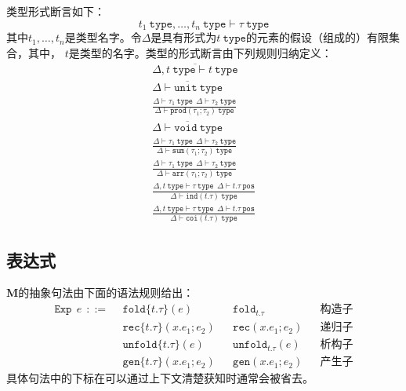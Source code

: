 类型形式断言如下：$$t_1\ \texttt{type},\dots,t_n\ \texttt{type}\vdash\tau\ \texttt{type}$$
其中$t_1,\dots,t_n$是类型名字。令$\Delta$是具有形式为$t\ \texttt{type}$的元素的假设（组成的）有限集合，其中，
$t$是类型的名字。类型的形式断言由下列规则归纳定义：
\begin{subequations}
	\begin{gather}
	\overline{\Delta,t\ \texttt{type}\vdash t\ \texttt{type}} \\
	\overline{\Delta\vdash\texttt{unit}\ \texttt{type}} \\
	\frac{\Delta\vdash\tau_1\ \texttt{type}\ \ \Delta\vdash\tau_2\ \texttt{type}}
	{\Delta\vdash\texttt{prod}(\tau_1;\tau_2)\ \texttt{type}} \\
	\overline{\Delta\vdash\texttt{void}\ \texttt{type}} \\
	\frac{\Delta\vdash\tau_1\ \texttt{type}\ \ \Delta\vdash\tau_2\ \texttt{type}}
	{\Delta\vdash\texttt{sum}(\tau_1;\tau_2)\ \texttt{type}} \\
	\frac{\Delta\vdash\tau_1\ \texttt{type}\ \ \Delta\vdash\tau_2\ \texttt{type}}
	{\Delta\vdash\texttt{arr}(\tau_1;\tau_2)\ \texttt{type}} \\
	\frac{\Delta,t\ \texttt{type}\vdash\tau\ \texttt{type}\ \ \Delta\vdash t.\tau\ \texttt{pos}}
	{\Delta\vdash\texttt{ind}(t.\tau)\ \texttt{type}} \\
	\frac{\Delta,t\ \texttt{type}\vdash\tau\ \texttt{type}\ \ \Delta\vdash t.\tau\ \texttt{pos}}
	{\Delta\vdash\texttt{coi}(t.\tau)\ \texttt{type}}
	\end{gather}
\end{subequations}

\subsection{表达式}
$\textbf{M}$的抽象句法由下面的语法规则给出：
\begin{align*}
	\texttt{Exp}\ \ e\ \ ::=\ \ &\texttt{fold}\{t.\tau\}(e) & &\texttt{fold}_{t.\tau} & &\text{构造子} \\
	&\texttt{rec}\{t.\tau\}(x.e_1;e_2) & &\texttt{rec}(x.e_1;e_2) & &\text{递归子} \\
	&\texttt{unfold}\{t.\tau\}(e) & &\texttt{unfold}_{t.\tau}(e) & &\text{析构子} \\
	&\texttt{gen}\{t.\tau\}(x.e_1;e_2) & &\texttt{gen}(x.e_1;e_2) & &\text{产生子} 
\end{align*}
具体句法中的下标在可以通过上下文清楚获知时通常会被省去。


